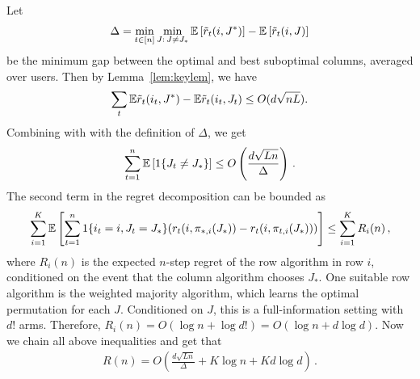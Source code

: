 Let
\begin{align*}
  \Delta =
  \min_{t \in [n]} \min_{J:\, J \neq J_\ast} \mathbb{E}\left[\tilde{r}_t(i, J^\ast)\right] - \mathbb{E}\left[\tilde{r}_t(i, J)\right]
\end{align*}
be the minimum gap between the optimal and best suboptimal columns, averaged over users. Then by Lemma~\ref{lem:keylem}, we have
$$    \sum_t \mathbb{E} \tilde{r}_t(i_t, J^*) -  \mathbb{E} \tilde{r}_t(i_t, J_t) \leq   O(d\sqrt{nL}).$$ 
Combining with with the definition of $\Delta$, we get
\begin{align*}
  \sum_{t = 1}^n \mathbb{E}\left[1\{J_t \neq J_\ast\}\right] \leq
 O \left(  \frac{d \sqrt{L n}}{\Delta} \right) \,.
\end{align*}
The second term in the regret decomposition can be bounded as
\begin{align*}
  \sum_{i = 1}^K \mathbb{E}\left[\sum_{t = 1}^n 1\{i_t = i, J_t = J_\ast\} (r_t(i, \pi_{\ast, i}(J_\ast)) - r_t(i, \pi_{t, i}(J_\ast)))\right] \leq
  \sum_{i = 1}^K R_i(n)\,,
\end{align*}
where $R_i(n)$ is the expected $n$-step regret of the row algorithm in row $i$, conditioned on the event that the column algorithm chooses $J_\ast$. One suitable row algorithm is the weighted majority algorithm, which learns the optimal permutation for each $J$. Conditioned on $J$, this is a full-information setting with $d!$ arms. Therefore, $R_i(n) = O(\log n + \log d!) = O(\log n + d \log d)$. Now we chain all above inequalities and get that
\begin{align*}
  R(n) = O\left(\frac{d \sqrt{L n}}{\Delta} + K \log n + K d \log d\right)\,.
\end{align*}



